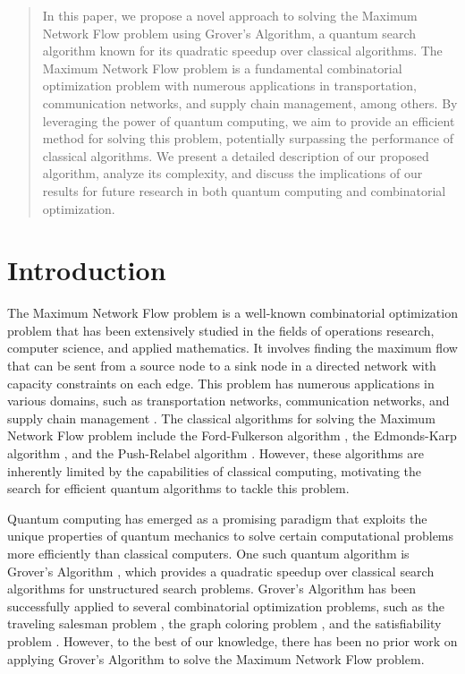 \begin{abstract}
In this paper, we propose a novel approach to solving the Maximum Network Flow problem using Grover's Algorithm, a quantum search algorithm known for its quadratic speedup over classical algorithms. The Maximum Network Flow problem is a fundamental combinatorial optimization problem with numerous applications in transportation, communication networks, and supply chain management, among others. By leveraging the power of quantum computing, we aim to provide an efficient method for solving this problem, potentially surpassing the performance of classical algorithms. We present a detailed description of our proposed algorithm, analyze its complexity, and discuss the implications of our results for future research in both quantum computing and combinatorial optimization.

\end{abstract}

\section{Introduction}
The Maximum Network Flow problem is a well-known combinatorial optimization problem that has been extensively studied in the fields of operations research, computer science, and applied mathematics. It involves finding the maximum flow that can be sent from a source node to a sink node in a directed network with capacity constraints on each edge. This problem has numerous applications in various domains, such as transportation networks, communication networks, and supply chain management \cite{Ahuja1993}. The classical algorithms for solving the Maximum Network Flow problem include the Ford-Fulkerson algorithm \cite{Ford1956}, the Edmonds-Karp algorithm \cite{Edmonds1972}, and the Push-Relabel algorithm \cite{Goldberg1988}. However, these algorithms are inherently limited by the capabilities of classical computing, motivating the search for efficient quantum algorithms to tackle this problem.

Quantum computing has emerged as a promising paradigm that exploits the unique properties of quantum mechanics to solve certain computational problems more efficiently than classical computers. One such quantum algorithm is Grover's Algorithm \cite{Grover1996}, which provides a quadratic speedup over classical search algorithms for unstructured search problems. Grover's Algorithm has been successfully applied to several combinatorial optimization problems, such as the traveling salesman problem \cite{Zalka1999}, the graph coloring problem \cite{Shi2003}, and the satisfiability problem \cite{Durr1996}. However, to the best of our knowledge, there has been no prior work on applying Grover's Algorithm to solve the Maximum Network Flow problem.

